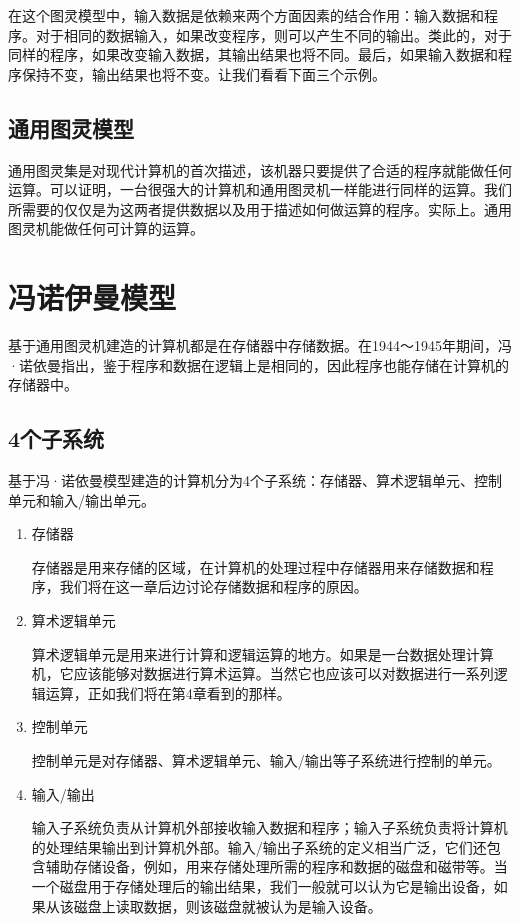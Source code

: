在这个图灵模型中，输入数据是依赖来两个方面因素的结合作用：输入数据和程序。对于相同的数据输入，如果改变程序，则可以产生不同的输出。类此的，对于同样的程序，如果改变输入数据，其输出结果也将不同。最后，如果输入数据和程序保持不变，输出结果也将不变。让我们看看下面三个示例。

\subsection{通用图灵模型}

通用图灵集是对现代计算机的首次描述，该机器只要提供了合适的程序就能做任何运算。可以证明，一台很强大的计算机和通用图灵机一样能进行同样的运算。我们所需要的仅仅是为这两者提供数据以及用于描述如何做运算的程序。实际上。通用图灵机能做任何可计算的运算。

\section{冯诺伊曼模型}

基于通用图灵机建造的计算机都是在存储器中存储数据。在1944～1945年期间，冯·诺依曼指出，鉴于程序和数据在逻辑上是相同的，因此程序也能存储在计算机的存储器中。

\subsection{4个子系统}

基于冯·诺依曼模型建造的计算机分为4个子系统：存储器、算术逻辑单元、控制单元和输入/输出单元。

\begin{enumerate}
	\item 存储器

	存储器是用来存储的区域，在计算机的处理过程中存储器用来存储数据和程序，我们将在这一章后边讨论存储数据和程序的原因。

	\item 算术逻辑单元

	算术逻辑单元是用来进行计算和逻辑运算的地方。如果是一台数据处理计算机，它应该能够对数据进行算术运算。当然它也应该可以对数据进行一系列逻辑运算，正如我们将在第4章看到的那样。

	\item 控制单元

	控制单元是对存储器、算术逻辑单元、输入/输出等子系统进行控制的单元。
	
	\item 输入/输出

	输入子系统负责从计算机外部接收输入数据和程序；输入子系统负责将计算机的处理结果输出到计算机外部。输入/输出子系统的定义相当广泛，它们还包含辅助存储设备，例如，用来存储处理所需的程序和数据的磁盘和磁带等。当一个磁盘用于存储处理后的输出结果，我们一般就可以认为它是输出设备，如果从该磁盘上读取数据，则该磁盘就被认为是输入设备。
\end{enumerate}


